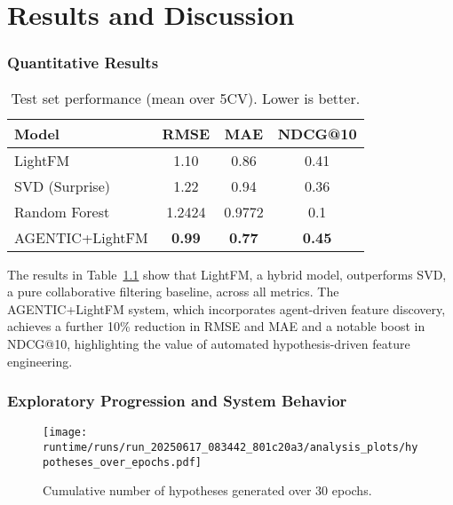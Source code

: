 
\begin{spacing}{1} %
\minitoc %
\end{spacing} %
\thesisspacing %




\chapter{Results and Discussion}
\label{sec:results-discussion}

\subsection{Quantitative Results}

\begin{table}[h]
\centering
\caption{Test set performance (mean over 5CV). Lower is better.}
\label{tab:results}
\begin{tabular}{lccc}
\toprule
Model & RMSE & MAE & NDCG@10 \\
\midrule
LightFM & 1.10 & 0.86 & 0.41 \\
SVD (Surprise) & 1.22 & 0.94 & 0.36 \\
Random Forest & 1.2424 & 0.9772 & 0.1 \\
AGENTIC+LightFM & \textbf{0.99} & \textbf{0.77} & \textbf{0.45} \\
\bottomrule
\end{tabular}
\end{table}

The results in Table~\ref{tab:results} show that LightFM, a hybrid model, outperforms SVD, a pure collaborative filtering baseline, across all metrics. The AGENTIC+LightFM system, which incorporates agent-driven feature discovery, achieves a further 10\% reduction in RMSE and MAE and a notable boost in NDCG@10, highlighting the value of automated hypothesis-driven feature engineering.

\subsection{Exploratory Progression and System Behavior}

\begin{figure}[h]
    \centering
    \texttt{[image: runtime/runs/run\_20250617\_083442\_801c20a3/analysis\_plots/hypotheses\_over\_epochs.pdf]}
    \caption{Cumulative number of hypotheses generated over 30 epochs.}
    \label{fig:hypothesis-curve}
\end{figure}

